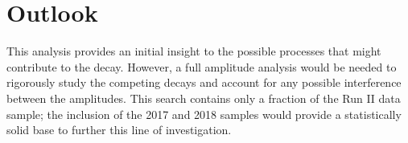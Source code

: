 \section{Outlook}
This analysis provides an initial insight to the possible processes that might contribute to the \decay{\Bp}{\Dsp\Kp\Km} decay. However, a full amplitude analysis would be needed to rigorously study the competing decays and account for any possible interference between the amplitudes. This search contains only a fraction of the Run II data sample; the inclusion of the 2017 and 2018 samples would provide a statistically solid base to further this line of investigation. 


